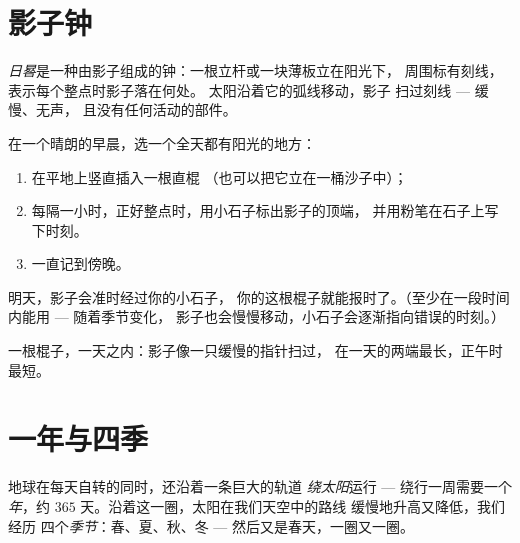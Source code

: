 \section{影子钟}

\begin{definition}[日晷]\label{def:g3:sun-days-seasons:sundial}
\emph{日晷}是一种由影子组成的钟：一根立杆或一块薄板立在阳光下，
周围标有刻线，表示每个整点时影子落在何处。
太阳沿着它的弧线移动，影子
扫过刻线 --- 缓慢、无声，
且没有任何活动的部件。
\end{definition}

\begin{method}[制作影子钟]\label{met:g3:sun-days-seasons:build}
在一个晴朗的早晨，选一个全天都有阳光的地方：
\begin{enumerate}
  \item 在平地上竖直插入一根直棍
        （也可以把它立在一桶沙子中）；
  \item 每隔一小时，正好整点时，用小石子标出影子的顶端，
        并用粉笔在石子上写下时刻。
  \item 一直记到傍晚。
\end{enumerate}
明天，影子会准时经过你的小石子，
你的这根棍子就能报时了。（至少在一段时间内能用 --- 随着季节变化，
影子也会慢慢移动，小石子会逐渐指向错误的时刻。）
\end{method}

\begin{omfigure}

{\small 一根棍子，一天之内：影子像一只缓慢的指针扫过，
在一天的两端最长，正午时最短。}
\end{omfigure}

\section{一年与四季}

\begin{definition}[一年与四季]\label{def:g3:sun-days-seasons:year}
地球在每天自转的同时，还沿着一条巨大的轨道
\emph{绕太阳}运行 --- 绕行一周需要一个
\emph{年}，约 $365$ 天。沿着这一圈，太阳在我们天空中的路线
缓慢地升高又降低，我们经历
四个\emph{季节}：春、夏、秋、冬
--- 然后又是春天，一圈又一圈。
\end{definition}

